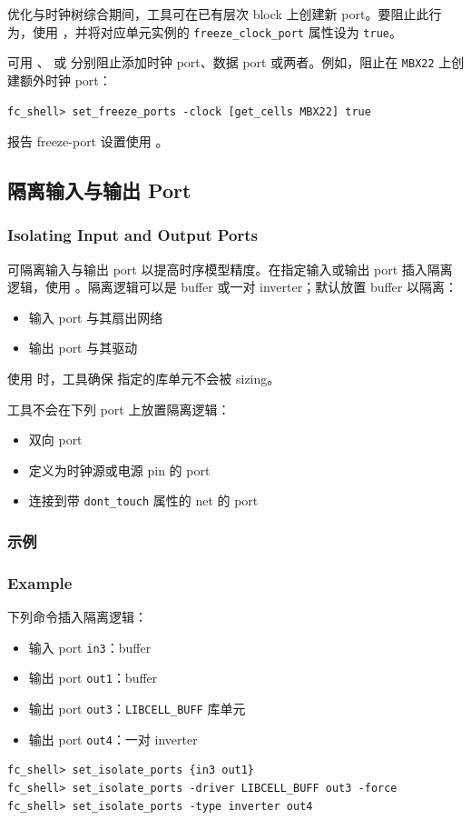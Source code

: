 优化与时钟树综合期间，工具可在已有层次 block 上创建新 port。要阻止此行为，使用 ，并将对应单元实例的 \texttt{freeze\_clock\_port} 属性设为 \texttt{true}。

可用 、 或  分别阻止添加时钟 port、数据 port 或两者。例如，阻止在 \texttt{MBX22} 上创建额外时钟 port：
\begin{lstlisting}
fc_shell> set_freeze_ports -clock [get_cells MBX22] true
\end{lstlisting}

报告 freeze-port 设置使用 。

\subsection{隔离输入与输出 Port}
\subsubsection*{Isolating Input and Output Ports}

可隔离输入与输出 port 以提高时序模型精度。在指定输入或输出 port 插入隔离逻辑，使用 。隔离逻辑可以是 buffer 或一对 inverter；默认放置 buffer 以隔离：
\begin{itemize}
  \item 输入 port 与其扇出网络
  \item 输出 port 与其驱动
\end{itemize}

使用  时，工具确保  指定的库单元不会被 sizing。

工具不会在下列 port 上放置隔离逻辑：
\begin{itemize}
  \item 双向 port
  \item 定义为时钟源或电源 pin 的 port
  \item 连接到带 \texttt{dont\_touch} 属性的 net 的 port
\end{itemize}

\subsubsection{示例}
\subsubsection*{Example}

下列命令插入隔离逻辑：
\begin{itemize}
  \item 输入 port \texttt{in3}：buffer
  \item 输出 port \texttt{out1}：buffer
  \item 输出 port \texttt{out3}：\texttt{LIBCELL\_BUFF} 库单元
  \item 输出 port \texttt{out4}：一对 inverter
\end{itemize}
\begin{lstlisting}
fc_shell> set_isolate_ports {in3 out1}
fc_shell> set_isolate_ports -driver LIBCELL_BUFF out3 -force
fc_shell> set_isolate_ports -type inverter out4
\end{lstlisting}

